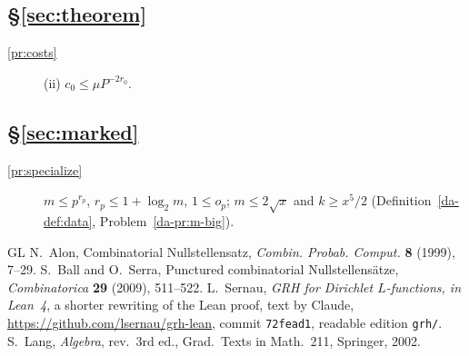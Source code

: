 \documentclass[reqno]{amsart}
\numberwithin{equation}{section}
\theoremstyle{plain}
\theoremstyle{definition}
\theoremstyle{remark}
\begin{document}
\subsection*{\S\ref{sec:theorem}}
\begin{description}
\item[\ref{pr:costs}] (ii) \(c_0 \le \mu P^{-2r_0}\).
\end{description}

\subsection*{\S\ref{sec:marked}}
\begin{description}
\item[\ref{pr:specialize}] \(m \le p^{r_p}\), \(r_p \le 1 + \log_2 m\), \(1 \le o_p\); \(m \le 2\sqrt x\) and \(k \ge x^5/2\) (Definition~\ref{da-def:data}, Problem~\ref{da-pr:m-big}).
\end{description}

\begin{thebibliography}{GL}
 N.~Alon, Combinatorial Nullstellensatz, \emph{Combin. Probab. Comput.} \textbf{8} (1999), 7--29.
 S.~Ball and O.~Serra, Punctured combinatorial Nullstellens\"atze, \emph{Combinatorica} \textbf{29} (2009), 511--522.
 L.~Sernau, \emph{GRH for Dirichlet \(L\)-functions, in Lean~4}, a shorter rewriting of the Lean proof, text by Claude, \url{https://github.com/lsernau/grh-lean}, commit \texttt{72fead1}, readable edition \texttt{grh/}.
 S.~Lang, \emph{Algebra}, rev.\ 3rd ed., Grad.\ Texts in Math.\ 211, Springer, 2002.
\end{thebibliography}
\end{document}
